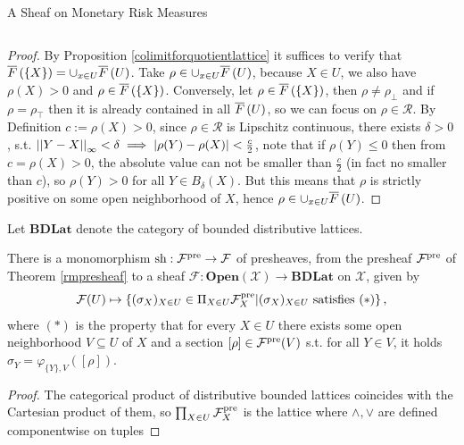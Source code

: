 \begin{subsection}{A Sheaf on Monetary Risk Measures}
\begin{corollary}
\[        \]
    \end{corollary}
    \begin{proof}
        By Proposition \ref{colimitforquotientlattice} it suffices to verify 
        that \( \overline{F}\left (\{X\} \right) = \cup_{x \in U} \overline{F}\left (U \right) \).
        Take \( \rho \in \cup_{x \in U} \overline{F}\left (U \right) \), because \( X \in U \), we also have \( \rho(X) > 0 \)
        and \( \rho \in \overline{F}\left (\{X\} \right) \).
        Conversely, let \( \rho \in \overline{F}\left (\{X\} \right) \), then \( \rho \neq \rho_{\bot} \) and if \( \rho = \rho_{\top} \)
        then it is already contained in all \( \overline{F}\left (U \right) \), so we can focus on \( \rho \in \mathcal{R} \). 
        By Definition \( c := \rho(X) > 0 \), since \( \rho \in \mathcal{R} \) is Lipschitz continuous, there exists
        \( \delta > 0 \), s.t. \( \left|\left| Y - X \right| \right|_{\infty} < \delta \implies |\rho(Y) - \rho(X)| < \frac{c}{2} \),
        note that if \( \rho(Y) \leq 0 \) then from \( c = \rho(X) > 0 \), the absolute value can not be smaller than \( \frac{c}{2} \)
        (in fact no smaller than \( c \)), so \( \rho(Y) > 0 \) for all \( Y \in B_{\delta}(X)\).
        But this means that \( \rho \) is strictly positive on some open neighborhood of \( X \), hence \( \rho \in \cup_{x \in U} \overline{F}\left (U \right) \).
    \end{proof}
    Let \( \textbf{BDLat} \) denote the category of bounded distributive lattices.
    \begin{proposition} \label{sheafification}
        There is a monomorphism \( \text{sh} : \mathcal{F}^{\text{pre}} \to \mathcal{F} \) of presheaves, from the presheaf \( \mathcal{F}^{\text{pre}} \) of Theorem \ref{rmpresheaf}
        to a sheaf \( \mathcal{F} : \textbf{Open}(\mathcal{X}) \to \textbf{BDLat} \) on \( \mathcal{X} \), given by
        \[
            \mathcal{F}(U) \mapsto \left \{ (\sigma_X)_{X \in U} \in \Pi_{X \in U} \mathcal{F}^{\text{pre}}_X | (\sigma_X)_{X \in U} \text{ satisfies } (*)  \right \},
        \]
        where \( (*) \) is the property that for every \( X \in U \) there exists some open neighborhood \(V \subseteq U\) of \( X \) and a section \( [\rho] \in \mathcal{F}^{\text{pre}}(V) \)
        s.t. for all \( Y \in V \), it holds \( \sigma_Y = \varphi_{\{Y\},V}([\rho]) \).
    \end{proposition}
    \begin{proof}
        The categorical product of distributive bounded lattices coincides with the Cartesian product \cite{catprodlattice}
        of them, so \( \prod_{X \in U} \mathcal{F}^{\text{pre}}_X \) is the lattice where \( \wedge, \vee \) are defined componentwise on tuples

\end{proof}
\end{subsection}
